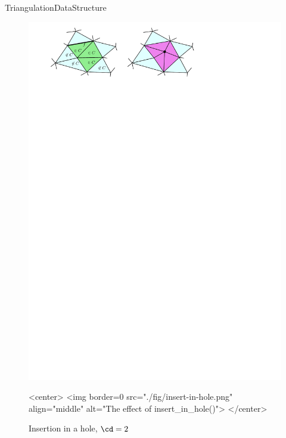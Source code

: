 \begin{ccRefConcept}{TriangulationDataStructure}
\begin{figure}[ht]
\begin{ccTexOnly}
\begin{center}
\includegraphics{Triangulation_ref/fig/insert-in-hole.pdf}
\end{center}
\end{ccTexOnly}
\begin{ccHtmlOnly}
<center>
<img border=0 src="./fig/insert-in-hole.png" align="middle" alt="The effect of insert_in_hole()">
</center>
\end{ccHtmlOnly}
\caption{Insertion in a hole, $\cd=2$\label{triangulation:fig:insert-hole}}
\end{figure}


\end{ccRefConcept}
